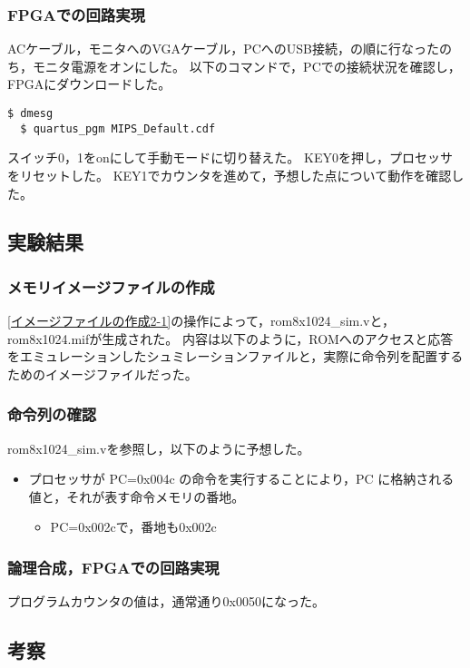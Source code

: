 \subsubsection{FPGAでの回路実現}
ACケーブル，モニタへのVGAケーブル，PCへのUSB接続，の順に行なったのち，モニタ電源をオンにした。
以下のコマンドで，PCでの接続状況を確認し，FPGAにダウンロードした。
\begin{lstlisting}[caption={FPGAでの回路実現},label={FPGAでの回路実現2-1}]
  $ dmesg
  $ quartus_pgm MIPS_Default.cdf
\end{lstlisting}

スイッチ0，1をonにして手動モードに切り替えた。
KEY0を押し，プロセッサをリセットした。
KEY1でカウンタを進めて，予想した点について動作を確認した。

\subsection{実験結果}
\subsubsection{メモリイメージファイルの作成}
\ref{イメージファイルの作成2-1}の操作によって，rom8x1024\_sim.vと，rom8x1024.mifが生成された。
内容は以下のように，ROMへのアクセスと応答をエミュレーションしたシュミレーションファイルと，実際に命令列を配置するためのイメージファイルだった。





\subsubsection{命令列の確認}
rom8x1024\_sim.vを参照し，以下のように予想した。
\begin{itemize}
  \item プロセッサが PC=0x004c の命令を実行することにより，PC に格納される値と，それが表す命令メモリの番地。
  \begin{itemize}
    \item PC=0x002cで，番地も0x002c
  \end{itemize}
\end{itemize}

\subsubsection{論理合成，FPGAでの回路実現}
プログラムカウンタの値は，通常通り0x0050になった。

\subsection{考察}
